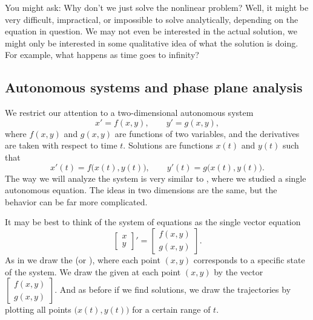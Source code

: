 You might ask: Why don't we just solve the nonlinear problem?  Well, it
might be very difficult, impractical, or impossible to solve analytically,
depending on the equation in question.  We may
not even be interested in the actual solution, we might only be interested
in some qualitative idea of what the solution is doing.  For example,
what happens as time goes to infinity?


\subsection{Autonomous systems and phase plane analysis}

We restrict our attention to a two-dimensional autonomous system
\begin{equation*}
x' = f(x,y) , \qquad y' = g(x,y) ,
\end{equation*}
where $f(x,y)$ and $g(x,y)$ are functions of two variables, and the
derivatives are taken with respect to time $t$.  Solutions are
functions $x(t)$ and $y(t)$ such that
\begin{equation*}
x'(t) = f\bigl(x(t),y(t)\bigr), \qquad
y'(t) = g\bigl(x(t),y(t)\bigr) .
\end{equation*}
The way we will analyze the system is very similar to
, where we studied a single autonomous equation.  The
ideas in two dimensions are the same, but the behavior can be
far more complicated.

It may be best to think of the system of equations as the single vector equation
\begin{equation} \label{eq:nlinautn2}
\begin{bmatrix} x \\ y \end{bmatrix} ' =
\begin{bmatrix} f(x,y) \\ g(x,y) \end{bmatrix} .
\end{equation}
As in  we draw
the \emph{} (or \emph{}),
where each point $(x,y)$ corresponds to a specific state of the system.
We draw the \emph{}
given at each
point $(x,y)$ by the vector
$\left[ \begin{smallmatrix} f(x,y) \\ g(x,y) \end{smallmatrix} \right]$.
And as before if we find solutions, we draw the trajectories
by plotting all points $\bigl(x(t),y(t)\bigr)$ for a certain range of $t$.

